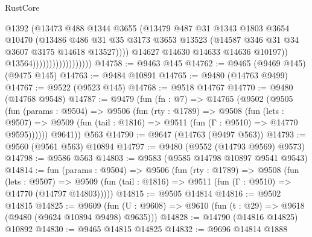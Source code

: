 \begin{lexlean}{RustCore}
\begin{coremodule}
                                            @1392
                                            (@13473
                                              @488
                                              @1344
                                              @3655
                                              (@13479
                                                @487
                                                @31
                                                @1343
                                                @1803
                                                @3654
                                                @10470
                                                (@13486
                                                  @486
                                                  @31
                                                  @35
                                                  @3173
                                                  @3653
                                                  @13523
                                                  (@14587 @346 @31 @34 @3607 @3175 @14618 @13527))))
                                            @14627
                                            @14630
                                            @14633
                                            @14636
                                            @10197))
                                        @13564))))))))))))))))))
@14758 := @9463 @145
@14762 := @9465 (@9469 @145) (@9475 @145)
@14763 := @9484 @10891
@14765 := @9480 (@14763 @9499)
@14767 := @9522 (@9523 @145)
@14768 := @9518 @14767
@14770 := @9480 (@14768 @9548)
@14787 := @9479
    (fun (fn : @7) =>
    @14765
      (@9502
        (@9505
          (fun (params : @9504) =>
          @9506
            (fun (rty : @1789) =>
            @9508
              (fun (lets : @9507) =>
              @9509 (fun (tail : @1816) => @9511 (fun (Γ : @9510) => @14770 @9595))))))
        @9641))
    @563
@14790 := @9647 (@14763 (@9497 @563))
@14793 := @9560 (@9561 @563) @10894
@14797 := @9480 (@9552 (@14793 @9569) @9573)
@14798 := @9586 @563
@14803 := @9583 (@9585 @14798 @10897 @9541 @9543)
@14814 := fun (params : @9504) =>
  @9506
    (fun (rty : @1789) =>
    @9508
      (fun (lets : @9507) =>
      @9509 (fun (tail : @1816) => @9511 (fun (Γ : @9510) => @14770 (@14797 @14803)))))
@14815 := @9505 @14814
@14816 := @9502 @14815
@14825 := @9609
    (fun (U : @9608) => @9610 (fun (t : @29) => @9618 (@9480 (@9624 @10894 @9498) @9635)))
@14828 := @14790 (@14816 @14825) @10892
@14830 := @9465 @14815 @14825
@14832 := @9696 @14814 @1888

\end{coremodule}
\end{lexlean}
